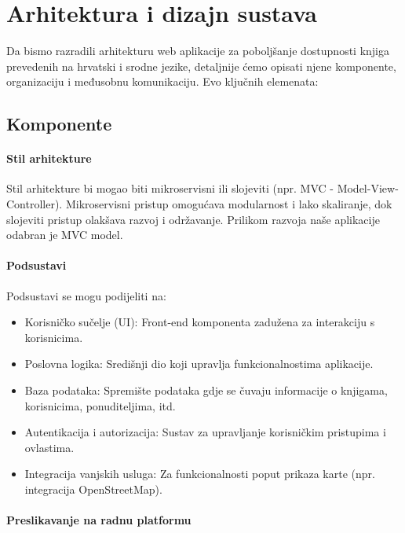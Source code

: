 \chapter{Arhitektura i dizajn sustava}
		
Da bismo razradili arhitekturu web aplikacije za poboljšanje dostupnosti knjiga prevedenih na hrvatski i srodne jezike, detaljnije ćemo opisati njene komponente, organizaciju i međusobnu komunikaciju. Evo ključnih elemenata:
	\\
	
	\section{Komponente}

        \subsubsection{Stil arhitekture}
        Stil arhitekture bi mogao biti mikroservisni ili slojeviti (npr. MVC - Model-View-Controller). Mikroservisni pristup omogućava modularnost i lako skaliranje, dok slojeviti pristup olakšava razvoj i održavanje. Prilikom razvoja naše aplikacije odabran je MVC model.
        
        
        \subsubsection{Podsustavi}

        Podsustavi se mogu podijeliti na:
        \begin{itemize}
		  \item {Korisničko sučelje (UI): Front-end komponenta zadužena za interakciju s korisnicima.}
		  \item {Poslovna logika: Središnji dio koji upravlja funkcionalnostima aplikacije.}
		  \item {Baza podataka: Spremište podataka gdje se čuvaju informacije o knjigama, korisnicima, ponuditeljima, itd.}		
            \item {Autentikacija i autorizacija: Sustav za upravljanje korisničkim pristupima i ovlastima.}	
             \item {Integracija vanjskih usluga: Za funkcionalnosti poput prikaza karte (npr. integracija OpenStreetMap).}		
	   \end{itemize}

        \subsubsection{Preslikavanje na radnu platformu}

